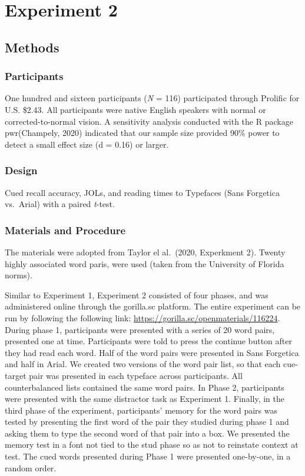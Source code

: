 \documentclass[
  english,
  jou]{apa6}
\begin{document}
\hypertarget{experiment-2}{%
\section{Experiment 2}\label{experiment-2}}

\hypertarget{methods}{%
\subsection{Methods}\label{methods}}

\hypertarget{participants-1}{%
\subsubsection{Participants}\label{participants-1}}

One hundred and sixteen participants (\emph{N} = 116) participated through Prolific for U.S. \$2.43. All participants were native English speakers with normal or corrected-to-normal vision. A sensitivity analysis conducted with the R package pwr(Champely, 2020) indicated that our sample size provided 90\% power to detect a small effect size (d = 0.16) or larger.

\hypertarget{design-1}{%
\subsubsection{Design}\label{design-1}}

Cued recall accuracy, JOLs, and reading times to Typefaces (Sans Forgetica vs.~Arial) with a paired \emph{t}-test.

\hypertarget{materials-and-procedure}{%
\subsubsection{Materials and Procedure}\label{materials-and-procedure}}

The materials were adopted from Taylor el al.~(2020, Experkment 2). Twenty highly associated word paris, were used (taken from the University of Florida norms).

Similar to Experiment 1, Experiment 2 consisted of four phases, and was administered online through the gorilla.sc platform. The entire experiment can be run by following the following link: \url{https://gorilla.sc/openmaterials/116224}. During phase 1, participants were presented with a series of 20 word pairs, presented one at time. Participants were told to press the continue button after they had read each word. Half of the word pairs were presented in
Sans Forgetica and half in Arial. We created two versions of the word pair list, so that each cue-target pair was presented in each typeface across participants. All counterbalanced lists contained the same word pairs. In Phase 2, participants were presented with the same distractor task as Experiment 1. Finally, in the third phase of the experiment, participants' memory for the word pairs was tested by presenting the first word of the pair they studied during phase 1 and asking them to type the second word of that pair into a box. We presented the memory test in a font not tied to the stud phase so as not to reinstate context at test. The cued words presented during Phase 1 were presented one-by-one, in a random order.
\end{document}

